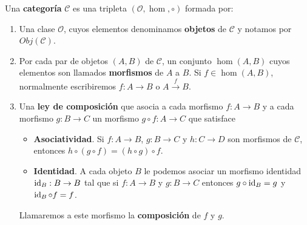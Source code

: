 \begin{definicion}
	Una \textbf{categoría} \(\mathcal{C}\) es una tripleta
	\((\mathcal{O}, \hom, \circ)\) formada por:
	\begin{enumerate}
		\item Una clase \(\mathcal{O}\), cuyos elementos denominamos \textbf{objetos} de
		\(\mathcal{C}\) y notamos por \(Obj(\mathcal{C})\).
		
		\item Por cada par de objetos \((A,B)\) de \(\mathcal{C}\), un conjunto
		\(\hom(A,B)\) cuyos elementos son llamados \textbf{morfismos} de \(A\) a \(B\).
		Si \(f \in \hom(A,B)\), normalmente escribiremos \(f: A \rightarrow B\) o \(A \xrightarrow
		{f}B\).
		
		\item Una \textbf{ley de composición} que asocia a cada morfismo
		\(f: A \rightarrow B\) y a cada morfismo \(g: B \rightarrow C\) un morfismo
		\(g \circ f : A \rightarrow C\) que satisface
		\begin{itemize}
			\item \textbf{Asociatividad}. Si \(f: A \rightarrow B\),
			\(g: B \rightarrow C\) y \(h : C \rightarrow D\) son morfismos de
			\(\mathcal{C}\), entonces \(h \circ (g \circ f) = (h \circ g) \circ f\).
			
			\item \textbf{Identidad}. A cada objeto \(B\) le podemos asociar un morfismo
			identidad \(\operatorname{id}_{B}: B \rightarrow B\) tal que si \(f: A \rightarrow B\) y
			\(g: B \rightarrow C\) entonces \(g \circ \operatorname{id}_{B}= g\) y \(\operatorname{id}_{B}\circ f =
			f\).
		\end{itemize}
		Llamaremos a este morfismo la \textbf{composición} de \(f\) y \(g\).
	\end{enumerate}
\end{definicion}

